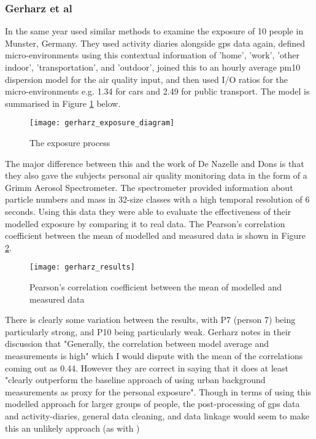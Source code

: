 \subsubsection{Gerharz et al}
\label{sec:dynamic_models_gerharz}

In the same year \cite{Gerharz2013} used similar methods to examine the exposure of 10 people in Munster, Germany. They used activity diaries alongside \gls{gps} data again, defined micro-environments using this contextual information of 'home', 'work', 'other indoor', 'transportation', and 'outdoor', joined this to an hourly average \gls{pm10} dispersion model for the air quality input, and then used I/O ratios for the micro-environments e.g. 1.34 for cars and 2.49 for public transport. The model is summarised in Figure \ref{fig:gerharz_exposure_diagram} below.

\begin{figure}[H]
\centering
\texttt{[image: gerharz\_exposure\_diagram]}
\caption{The exposure process}
\label{fig:gerharz_exposure_diagram}
\end{figure}

The major difference between this and the work of De Nazelle and Dons is that they also gave the subjects personal air quality monitoring data in the form of a Grimm Aerosol Spectrometer. The spectrometer provided information about particle numbers and mass in 32-size classes with a high temporal resolution of 6 seconds. Using this data they were able to evaluate the effectiveness of their modelled exposure by comparing it to real data. The Pearson’s correlation coefficient between the mean of modelled and measured data is shown in Figure \ref{fig:gerharz_results}.

\begin{figure}[H]
\centering
\texttt{[image: gerharz\_results]}
\caption{Pearson’s correlation coefficient between the mean of modelled and measured data}
\label{fig:gerharz_results}
\end{figure}

There is clearly some variation between the results, with P7 (person 7) being particularly strong, and P10 being particularly weak. Gerharz notes in their discussion that "Generally, the correlation between model average and measurements is high" which I would dispute with the mean of the correlations coming out as 0.44. However they are correct in saying that it does at least "clearly outperform the baseline approach of using urban background measurements as proxy for the personal exposure". Though in terms of using this modelled approach for larger groups of people, the post-processing of \gls{gps} data and activity-diaries, general data cleaning, and data linkage would seem to make this an unlikely approach (as with \cite{DeNazelle2013})

